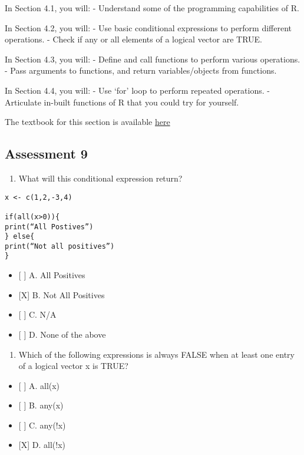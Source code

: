 \documentclass[]{article}
\providecommand{\tightlist}{%
  \setlength{\itemsep}{0pt}\setlength{\parskip}{0pt}}
\begin{document}
In Section 4.1, you will: - Understand some of the programming
capabilities of R.

In Section 4.2, you will: - Use basic conditional expressions to perform
different operations. - Check if any or all elements of a logical vector
are TRUE.

In Section 4.3, you will: - Define and call functions to perform various
operations. - Pass arguments to functions, and return variables/objects
from functions.

In Section 4.4, you will: - Use `for' loop to perform repeated
operations. - Articulate in-built functions of R that you could try for
yourself.

The textbook for this section is available
\href{https://rafalab.github.io/dsbook/programming-basics.html}{here}

\hypertarget{assessment-9}{%
\subsection{Assessment 9}\label{assessment-9}}

\begin{enumerate}
\def\labelenumi{\arabic{enumi}.}
\tightlist
\item
  What will this conditional expression return?
\end{enumerate}

\begin{verbatim}
x <- c(1,2,-3,4)

if(all(x>0)){
print(“All Postives”)
} else{
print(“Not all positives”)
}
\end{verbatim}

\begin{itemize}
\tightlist
\item
  {[} {]} A. All Positives
\item
  {[}X{]} B. Not All Positives
\item
  {[} {]} C. N/A
\item
  {[} {]} D. None of the above
\end{itemize}

\begin{enumerate}
\def\labelenumi{\arabic{enumi}.}
\setcounter{enumi}{1}
\tightlist
\item
  Which of the following expressions is always FALSE when at least one
  entry of a logical vector x is TRUE?
\end{enumerate}

\begin{itemize}
\tightlist
\item
  {[} {]} A. all(x)
\item
  {[} {]} B. any(x)
\item
  {[} {]} C. any(!x)
\item
  {[}X{]} D. all(!x)
\end{itemize}
\end{document}
